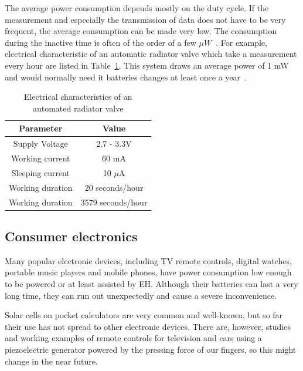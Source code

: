 \documentclass[a4paper,10pt]{article}
\begin{document}
The average power consumption depends mostly on the duty cycle. If the measurement and especially the transmission of data does not have to be very frequent, the average consumption can be made very low. The consumption during the inactive time is often of the order of a few $\mu W$~\cite{Salerno10}. For example, electrical characteristic of an automatic radiator valve which take a measurement every hour are listed in Table~\ref{tab:zbarv}. This system draws an average power of 1 mW and would normally need it batteries changes at least once a year~\cite{teg-wsn-ieee}. 

\begin{table}[h]
  \centering
  \begin{tabular}{|c|c|}
\hline
    Parameter & Value \\
\hline
Supply Voltage & 2.7 - 3.3V \\
Working current & 60 mA \\
Sleeping current & 10 $\mu$A \\
Working duration & 20 seconds/hour \\
Working duration & 3579 seconds/hour \\
\hline
  \end{tabular}
\caption{Electrical characteristics of an automated radiator valve}
\label{tab:zbarv}
\end{table}

\subsection{Consumer electronics}

Many popular electronic devices, including TV remote controls, digital watches, portable music players and mobile phones, have power consumption low enough to be powered or at least assisted by \ac{EH}. Although their batteries can last a very long time, they can run out unexpectedly and cause a severe inconvenience. 

Solar cells on pocket calculators are very common and well-known, but so far their use has not spread to other electronic devices. There are, however, studies and working examples of remote controls for television and cars using a piezoelectric generator powered by the pressing force of our fingers, so this might change in the near future. 
\end{document}
